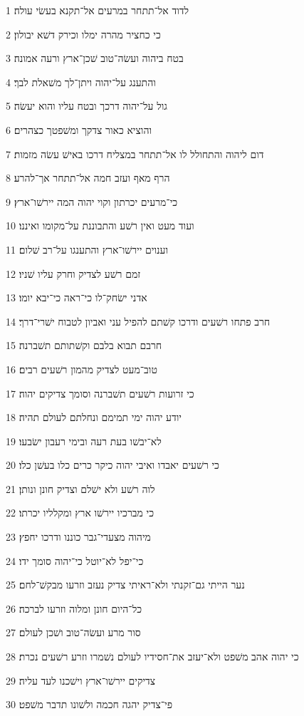 \par 1 לדוד אל־תתחר במרעים אל־תקנא בעשׂי עולה׃
\par 2 כי כחציר מהרה ימלו וכירק דשׁא יבולון׃
\par 3 בטח ביהוה ועשׂה־טוב שׁכן־ארץ ורעה אמונה׃
\par 4 והתענג על־יהוה ויתן־לך משׁאלת לבך׃
\par 5 גול על־יהוה דרכך ובטח עליו והוא יעשׂה׃
\par 6 והוציא כאור צדקך ומשׁפטך כצהרים׃
\par 7 דום ליהוה והתחולל לו אל־תתחר במצליח דרכו באישׁ עשׂה מזמות׃
\par 8 הרף מאף ועזב חמה אל־תתחר אך־להרע׃
\par 9 כי־מרעים יכרתון וקוי יהוה המה יירשׁו־ארץ׃
\par 10 ועוד מעט ואין רשׁע והתבוננת על־מקומו ואיננו׃
\par 11 וענוים יירשׁו־ארץ והתענגו על־רב שׁלום׃
\par 12 זמם רשׁע לצדיק וחרק עליו שׁניו׃
\par 13 אדני ישׂחק־לו כי־ראה כי־יבא יומו׃
\par 14 חרב פתחו רשׁעים ודרכו קשׁתם להפיל עני ואביון לטבוח ישׁרי־דרך׃
\par 15 חרבם תבוא בלבם וקשׁתותם תשׁברנה׃
\par 16 טוב־מעט לצדיק מהמון רשׁעים רבים׃
\par 17 כי זרועות רשׁעים תשׁברנה וסומך צדיקים יהוה׃
\par 18 יודע יהוה ימי תמימם ונחלתם לעולם תהיה׃
\par 19 לא־יבשׁו בעת רעה ובימי רעבון ישׂבעו׃
\par 20 כי רשׁעים יאבדו ואיבי יהוה כיקר כרים כלו בעשׁן כלו׃
\par 21 לוה רשׁע ולא ישׁלם וצדיק חונן ונותן׃
\par 22 כי מברכיו יירשׁו ארץ ומקלליו יכרתו׃
\par 23 מיהוה מצעדי־גבר כוננו ודרכו יחפץ׃
\par 24 כי־יפל לא־יוטל כי־יהוה סומך ידו׃
\par 25 נער הייתי גם־זקנתי ולא־ראיתי צדיק נעזב וזרעו מבקשׁ־לחם׃
\par 26 כל־היום חונן ומלוה וזרעו לברכה׃
\par 27 סור מרע ועשׂה־טוב ושׁכן לעולם׃
\par 28 כי יהוה אהב משׁפט ולא־יעזב את־חסידיו לעולם נשׁמרו וזרע רשׁעים נכרת׃
\par 29 צדיקים יירשׁו־ארץ וישׁכנו לעד עליה׃
\par 30 פי־צדיק יהגה חכמה ולשׁונו תדבר משׁפט׃

